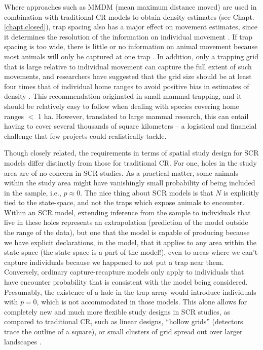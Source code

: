 Where approaches such as MMDM (mean maximum distance moved) are used in combination with
traditional CR models to obtain density estimates (see
Chapt. \ref{chapt.closed}), trap spacing also has a major effect on
movement estimates, since it determines the resolution of the
information on individual movement \citep{parmenter_etal:2003,
  wilson_anderson:1985b}. If trap spacing is too wide, there is little
or no information on animal movement because most animals will only be
captured at one trap \citep{dillon_kelly:2007}. In addition, only a
trapping grid that is large relative to individual movement can
capture the full extent of such movements, and researchers have
suggested that the grid size should be at least four times that of
individual home ranges to avoid positive bias in estimates of density
\citep{bondrup-nielsen:1983}.  This recommendation originated in small
mammal trapping, and it should be relatively easy to follow when
dealing with species covering home ranges $<$ 1 ha. However, translated
to large mammal research, this can entail having to cover several
thousands of square kilometers -- a logistical and financial challenge
that few projects could realistically tackle.

Though closely related, the requirements in terms of spatial study
design for SCR models differ distinctly from those for traditional
CR. For one, holes in the study area are of no concern in SCR studies.
As a
practical matter, some animals within the study area might have
vanishingly small probability of being included in the sample, i.e.,
$p \approx 0$. The nice thing about SCR models is that $N$ is
explicitly tied to the state-space, and not the traps which expose
animals to encounter.  Within an SCR model, extending inference from the
sample to individuals that live in these holes represents an
extrapolation (prediction of the model outside the range of the data),
but one that the model is capable of producing because we have
explicit declarations, in the model, that it applies to any area
within the state-space (the state-space is a part of the model!), even
to areas where we can't capture individuals because we happened to not
put a trap near them. Conversely, ordinary capture-recapture models
only apply to individuals that have encounter probability that is
consistent with the model being considered. Presumably, the existence
of a hole in the trap array would introduce individuals with $p=0$,
which is not accommodated in those models. This alone allows for
completely new and much more flexible study designs in SCR studies, as
compared to traditional CR, such as linear designs, ``hollow grids''
(detectors trace the outline of a square), or small clusters of grid
spread out over larger landscapes  \citep{efford_etal:2005,
  efford_etal:2009euring, efford_fewster:2012}.

